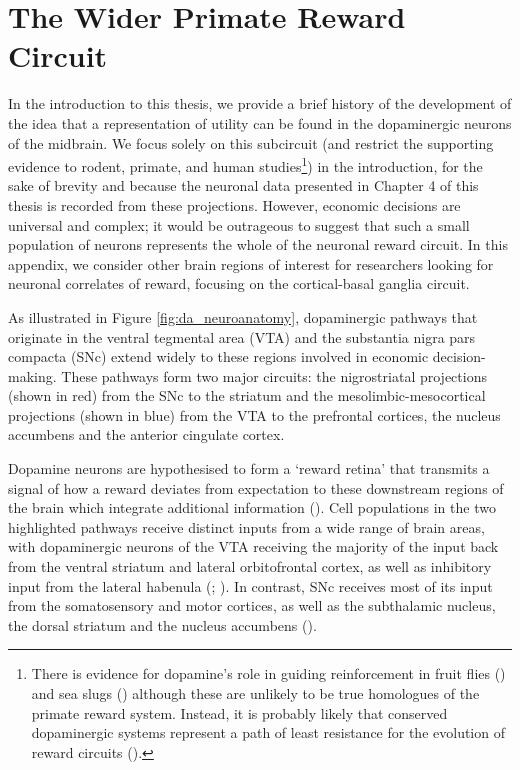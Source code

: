 \chapter{The Wider Primate Reward Circuit} 

\ifpdf
    \graphicspath{{Appendix1.3/Figs/Raster/}{Appendix1.3/Figs/PDF/}{Appendix1.3/Figs/}}
\else
    \graphicspath{{Appendix1.3/Figs/Vector/}{Appendix1.3/Figs/}}
\fi

In the introduction to this thesis, we provide a brief history of the development of the idea that a representation of utility can be found in the dopaminergic neurons of the midbrain. We focus solely on this subcircuit (and restrict the supporting evidence to rodent, primate, and human studies\footnote{There is evidence for dopamine’s role in guiding reinforcement in fruit flies (\cite{waddellReinforcementSignallingDrosophila2013}) and sea slugs (\cite{reyesReinforcementVitroAnalog2005}) although these are unlikely to be true homologues of the primate reward system. Instead, it is probably likely that conserved dopaminergic systems represent a path of least resistance for the evolution of reward circuits (\cite{barronRolesDopamineRelated2010}).}) in the introduction, for the sake of brevity and because the neuronal data presented in Chapter 4 of this thesis is recorded from these projections. However, economic decisions are universal and complex; it would be outrageous to suggest that such a small population of neurons represents the whole of the neuronal reward circuit. In this appendix, we consider other brain regions of interest for researchers looking for neuronal correlates of reward, focusing on the cortical-basal ganglia circuit.

As illustrated in Figure \ref{fig:da_neuroanatomy}, dopaminergic pathways that originate in the ventral tegmental area (VTA) and the substantia nigra pars compacta (SNc) extend widely to these regions involved in economic decision-making. These pathways form two major circuits: the nigrostriatal projections (shown in red) from the SNc to the striatum and the mesolimbic-mesocortical projections (shown in blue) from the VTA to the prefrontal cortices, the nucleus accumbens and the anterior cingulate cortex.

Dopamine neurons are hypothesised to form a ‘reward retina’ that transmits a signal of how a reward deviates from expectation to these downstream regions of the brain which integrate additional information (\cite{schultz2009midbrain}). Cell populations in the two highlighted pathways receive distinct inputs from a wide range of brain areas, with dopaminergic neurons of the VTA receiving the majority of the input back from the ventral striatum and lateral orbitofrontal cortex, as well as inhibitory input from the lateral habenula (\cite{matsumotoRepresentationNegativeMotivational2009}; \cite{matsumotoTwoTypesDopamine2009}). In contrast, SNc receives most of its input from the somatosensory and motor cortices, as well as the subthalamic nucleus, the dorsal striatum and the nucleus accumbens (\cite{watabeuchidaWholeBrainMappingDirect2012}).

